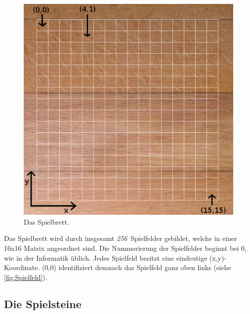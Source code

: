 \documentclass[a4paper, ngerman]{scrartcl}
\newcommand{\SpielFelderAnzahl}{\emph{256}}
\begin{document}
\begin{figure}[h] \centering 
	\includegraphics[scale = 0.25]{images/Spielbrett}
	\caption{Das Spielbrett.}
	\label{fig:Spielfeld}
\end{figure}
Das Spielbrett wird durch insgesamt \SpielFelderAnzahl\ Spielfelder gebildet, welche in einer 16x16 Matrix angeordnet sind. Die Nummerierung der Spielfelder beginnt bei 0, wie in der Informatik üblich. Jedes Spielfeld besitzt eine eindeutige (x,y)-Koordinate. (0,0) identifiziert demnach das Spielfeld ganz  oben links (siehe \autoref{fig:Spielfeld}).\\

\subsection{Die Spielsteine}
\end{document}
